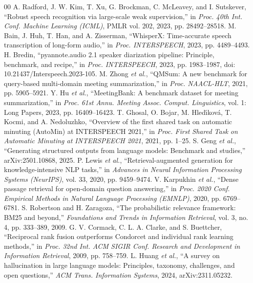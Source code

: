 \documentclass[conference]{IEEEtran}
\begin{document}
\balance
\begin{thebibliography}{00}
 A. Radford, J. W. Kim, T. Xu, G. Brockman, C. McLeavey, and I. Sutskever, ``Robust speech recognition via large-scale weak supervision,'' in \textit{Proc. 40th Int. Conf. Machine Learning (ICML)}, PMLR vol. 202, 2023, pp. 28492--28518.
 M. Bain, J. Huh, T. Han, and A. Zisserman, ``WhisperX: Time-accurate speech transcription of long-form audio,'' in \textit{Proc. INTERSPEECH}, 2023, pp. 4489--4493.
 H. Bredin, ``pyannote.audio 2.1 speaker diarization pipeline: Principle, benchmark, and recipe,'' in \textit{Proc. INTERSPEECH}, 2023, pp. 1983--1987, doi: 10.21437/Interspeech.2023-105.
 M. Zhong \textit{et al.}, ``QMSum: A new benchmark for query-based multi-domain meeting summarization,'' in \textit{Proc. NAACL-HLT}, 2021, pp. 5905--5921.
 Y. Hu \textit{et al.}, ``MeetingBank: A benchmark dataset for meeting summarization,'' in \textit{Proc. 61st Annu. Meeting Assoc. Comput. Linguistics}, vol. 1: Long Papers, 2023, pp. 16409--16423.
 T. Ghosal, O. Bojar, M. Hled\'{\i}kov\'{a}, T. Kocmi, and A. Nedoluzhko, ``Overview of the first shared task on automatic minuting (AutoMin) at INTERSPEECH 2021,'' in \textit{Proc. First Shared Task on Automatic Minuting at INTERSPEECH 2021}, 2021, pp. 1--25.
 S. Geng \textit{et al.}, ``Generating structured outputs from language models: Benchmark and studies,'' arXiv:2501.10868, 2025.
 P. Lewis \textit{et al.}, ``Retrieval-augmented generation for knowledge-intensive NLP tasks,'' in \textit{Advances in Neural Information Processing Systems (NeurIPS)}, vol. 33, 2020, pp. 9459--9474.
 V. Karpukhin \textit{et al.}, ``Dense passage retrieval for open-domain question answering,'' in \textit{Proc. 2020 Conf. Empirical Methods in Natural Language Processing (EMNLP)}, 2020, pp. 6769--6781.
 S. Robertson and H. Zaragoza, ``The probabilistic relevance framework: BM25 and beyond,'' \textit{Foundations and Trends in Information Retrieval}, vol. 3, no. 4, pp. 333--389, 2009.
 G. V. Cormack, C. L. A. Clarke, and S. Buettcher, ``Reciprocal rank fusion outperforms Condorcet and individual rank learning methods,'' in \textit{Proc. 32nd Int. ACM SIGIR Conf. Research and Development in Information Retrieval}, 2009, pp. 758--759.
 L. Huang \textit{et al.}, ``A survey on hallucination in large language models: Principles, taxonomy, challenges, and open questions,'' \textit{ACM Trans. Information Systems}, 2024, arXiv:2311.05232.

\end{thebibliography}
\end{document}
